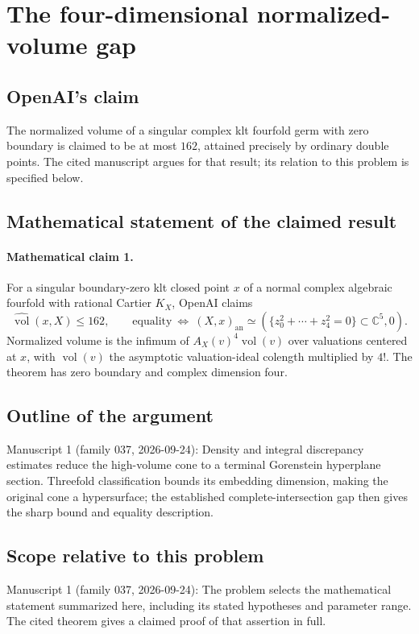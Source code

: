 \documentclass[11pt]{article}
\begin{document}
\section*{The four-dimensional normalized-volume gap}

\subsection{OpenAI's claim}
The normalized volume of a singular complex klt fourfold germ with zero boundary is claimed to be at most $162$, attained precisely by ordinary double points. The cited manuscript argues for that result; its relation to this problem is specified below.

\subsection{Mathematical statement of the claimed result}
\paragraph{Mathematical claim 1.} For a singular boundary-zero klt closed point $x$ of a normal complex algebraic fourfold with rational Cartier $K_X$, OpenAI claims
\[
\widehat{\operatorname{vol}}(x,X)\le162,
\qquad\text{equality}\ \Longleftrightarrow\ (X,x)_{\mathrm{an}}\simeq(\{z_0^2+\cdots+z_4^2=0\}\subset\mathbb C^5,0).
\]
Normalized volume is the infimum of $A_X(v)^4\operatorname{vol}(v)$ over valuations centered at $x$, with $\operatorname{vol}(v)$ the asymptotic valuation-ideal colength multiplied by $4!$. The theorem has zero boundary and complex dimension four.

\subsection{Outline of the argument}
Manuscript 1 (family 037, 2026-09-24): Density and integral discrepancy estimates reduce the high-volume cone to a terminal Gorenstein hyperplane section. Threefold classification bounds its embedding dimension, making the original cone a hypersurface; the established complete-intersection gap then gives the sharp bound and equality description.

\subsection{Scope relative to this problem}
Manuscript 1 (family 037, 2026-09-24): The problem selects the mathematical statement summarized here, including its stated hypotheses and parameter range. The cited theorem gives a claimed proof of that assertion in full.
\end{document}
